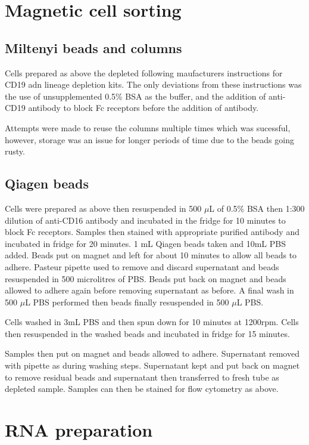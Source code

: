 \section{Magnetic cell sorting}
\label{Methods:MACSdepletion}

\subsection{Miltenyi beads and columns}

Cells prepared as above the depleted following maufacturers instructions for CD19 adn lineage depletion kits.
The only deviations from these instructions was the use of unsupplemented 0.5\% BSA as the buffer, and the addition of anti-CD19 antibody to block Fc receptors before the addition of antibody.

Attempts were made to reuse the columns multiple times which was sucessful, however, storage was an issue for longer periods of time due to the beads going rusty.

\subsection{Qiagen beads}

Cells were prepared as above then resuspended in 500 $\mu$L of 0.5\% BSA then 1:300 dilution of anti-CD16 antibody and incubated in the fridge for 10 minutes to block Fc receptors.
Samples then stained with appropriate purified antibody and incubated in fridge for 20 minutes.
1 mL Qiagen beads taken and 10mL PBS added.
Beads put on magnet and left for about 10 minutes to allow all beads to adhere.
Pasteur pipette used to remove and discard supernatant and beads resuspended in 500 microlitres of PBS.
Beads put back on magnet and beads allowed to adhere again before removing supernatant as before.
A final wash in 500 $\mu$L PBS performed then beads finally resuspended in 500 $\mu$L PBS.

Cells washed in 3mL PBS and then spun down for 10 minutes at 1200rpm.
Cells then resuspended in the washed beads and incubated in fridge for 15 minutes.

Samples then put on magnet and beads allowed to adhere.
Supernatant removed with pipette as during washing steps.
Supernatant kept and put back on magnet to remove residual beads and supernatant then transferred to fresh tube as depleted sample.
Samples can then be stained for flow cytometry as above.

\section{RNA preparation}

